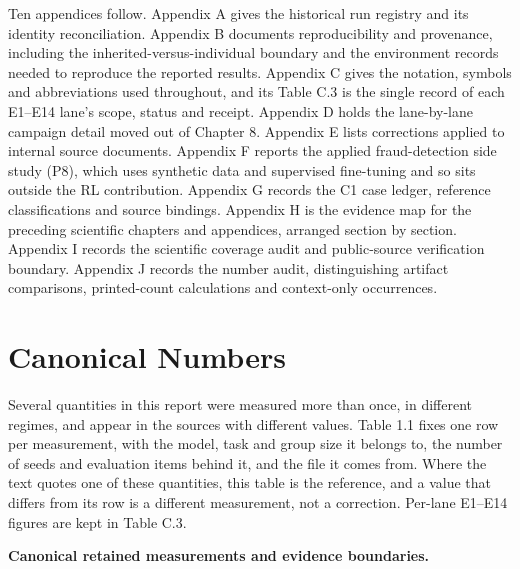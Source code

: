 \documentclass[12pt,a4paper]{report}
\begin{document}
Ten appendices follow. Appendix A gives the historical run registry and
its identity reconciliation. Appendix B documents reproducibility and
provenance, including the inherited-versus-individual boundary and the
environment records needed to reproduce the reported results. Appendix C
gives the notation, symbols and abbreviations used throughout, and its
Table C.3 is the single record of each E1--E14 lane's scope, status and
receipt. Appendix D holds the lane-by-lane campaign detail moved out of
Chapter 8. Appendix E lists corrections applied to internal source
documents. Appendix F reports the applied fraud-detection side study
(P8), which uses synthetic data and supervised fine-tuning and so sits
outside the RL contribution. Appendix G records the C1 case ledger,
reference classifications and source bindings. Appendix H is the
evidence map for the preceding scientific chapters and appendices,
arranged section by section. Appendix I records the scientific coverage
audit and public-source verification boundary. Appendix J records the
number audit, distinguishing artifact comparisons, printed-count
calculations and context-only occurrences.

\section{Canonical Numbers}\label{canonical-numbers}

Several quantities in this report were measured more than once, in
different regimes, and appear in the sources with different values.
Table 1.1 fixes one row per measurement, with the model, task and group
size it belongs to, the number of seeds and evaluation items behind it,
and the file it comes from. Where the text quotes one of these
quantities, this table is the reference, and a value that differs from
its row is a different measurement, not a correction. Per-lane E1--E14
figures are kept in Table C.3.

\textbf{Canonical retained measurements and evidence boundaries.}
\end{document}
